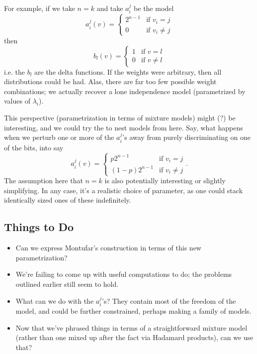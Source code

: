 \documentclass[12pt]{article}
\begin{document}
For example, if we take $n=k$ and take $a_i^j$ be the model
\[
    a_i^j(v) = \begin{cases}
        2^{n-1} & \text{if $v_i = j$}\\
        0 & \text{if $v_i \ne j$}
    \end{cases}
\]
then 
\[
    b_l(v) = \begin{cases}
        1 & \text{if $v = l$}\\
        0 & \text{if $v \ne l$}
    \end{cases}
\]
i.e. the $b_l$ are the delta functions.  If the weights were arbitrary, then all
distributions could be had.  Alas, there are far too few possible weight
combinations; we actually recover a lone independence model (parametrized by
values of $\lambda_i$).

This perspective (parametrization in terms of mixture models) might (?) be
interesting, and we could try the to nest models from here.  Say, what happens
when we perturb one or more of the $a_i^j$'s away from purely discriminating on
one of the bits, into say
\[
    a_i^j(v) = \begin{cases}
        p 2^{n-1} & \text{if $v_i = j$}\\
        (1 - p) 2^{n-1}  & \text{if $v_i \ne j$}
    \end{cases}.
\]
The assumption here that $n=k$ is also potentially interesting or slightly
simplifying.  In any case, it's a realistic choice of parameter, as one could
stack identically sized ones of these indefinitely.

\subsection{Things to Do}

\begin{itemize}
\item Can we express Montufar's construction in terms of this new parametrization?
\item We're failing to come up with useful computations to do; the problems
outlined earlier still seem to hold.
\item What can we do with the $a_i^j$'s?  They contain most of the freedom of
the model, and could be further constrained, perhaps making a family of models.
\item Now that we've phrased things in terms of a straightforward mixture model
(rather than one mixed up after the fact via Hadamard products), can we use
that?
\end{itemize}
\end{document}
